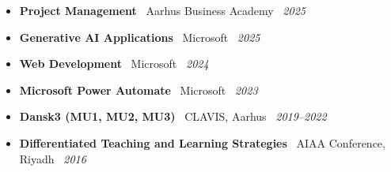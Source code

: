 \documentclass[letterpaper,10pt]{article}
\begin{document}
\vspace{4pt}
\begin{itemize}[label=\textcolor{gray!80}{}, leftmargin=3em, itemsep=2pt, parsep=0pt, topsep=2pt]
\item {\footnotesize \textbf{Project Management}  \hfill
   \quad \hspace*{1.5em}\textcolor{gray!80}{\faMapMarker*~Aarhus Business Academy} \hspace*{1.5em} \textcolor{gray!80}{\faCalendar*}~\textit{2025}}
  \item {\footnotesize \textbf{Generative AI Applications}  \hfill
   \quad \hspace*{1.5em}\textcolor{gray!80}{\faMapMarker*~Microsoft} \hspace*{1.5em} \textcolor{gray!80}{\faCalendar*}~\textit{2025}}
    \item {\footnotesize \textbf{Web Development}  \hfill
   \quad \hspace*{1.5em}\textcolor{gray!80}{\faMapMarker*~Microsoft} \hspace*{1.5em} \textcolor{gray!80}{\faCalendar*}~\textit{2024}}
  \item {\footnotesize \textbf{Microsoft Power Automate} \hfill 
  \hspace*{1.5em}\textcolor{gray!80}{\faMapMarker*~Microsoft} \hspace*{1.5em} \textcolor{gray!80}{\faCalendar*}~\textit{2023}}

  \item {\footnotesize \textbf{Dansk3 (MU1, MU2, MU3)} \hfill
   \quad \hspace*{1.5em}\textcolor{gray!80}{\faMapMarker*~CLAVIS, Aarhus} \hspace*{1.5em} \textcolor{gray!80}{\faCalendar*}~\textit{2019–2022}}


  \item {\footnotesize \textbf{Differentiated Teaching and Learning Strategies} \hfill 
  \quad \hspace*{1.5em}\textcolor{gray!80}{\faMapMarker*~AIAA Conference, Riyadh} \hspace*{1.5em} \textcolor{gray!80}{\faCalendar*}~\textit{2016}}



\end{itemize}
\end{document}
